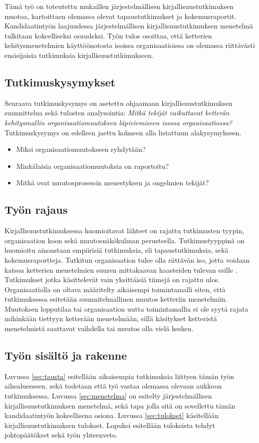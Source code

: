 Tämä työ on toteutettu mukaillen järjestelmällisen kirjallisuustutkimuksen
muotoa, kartoittaen olemassa olevat tapaustutkimukset ja kokemusraportit.
Kandidaatintyön laajuudessa järjestelmällisen kirjallisuustutkimuksen menetelmä
tulkitaan kokeelliseksi osuudeksi. Työn tulos osoittaa, että ketterien
kehitysmenetelmien käyttöönotosta isoissa organisaatioissa on olemassa
riittävästi ensisijaisia tutkimuksia kirjallisuustutkimukseen.

\subsection{Tutkimuskysymykset}
Seuraava tutkimuskysymys on asetettu ohjaamaan kirjallisuustutkimuksen
suunnittelua sekä tulosten analysointia:
\textit{Mitkä tekijät vaikuttavat ketterän kehitysmallin organisaatiomuutoksen
läpiviemiseen isossa organisaatiossa?} Tutkimuskysymys on edelleen jaettu
kolmeen alla listattuun alakysymykseen.

\begin{itemize}
\item Miksi organisaatiomuutokseen ryhdytään?
\item Minkälaisia organisaatiomuutoksia on raportoitu?
\item Mitkä ovat muutosprosessin menestyksen ja ongelmien tekijät?
\end{itemize}

\subsection{Työn rajaus}
Kirjallisuustutkimuksessa huomioitavat lähteet on rajattu tutkimusten tyypin,
organisaation koon sekä muutosnäkökulman perusteella. Tutkimustyyppinä on
huomioitu ainoastaan empiirisiä tutkimuksia, eli tapaustutkimuksia, sekä
kokemusraportteja. Tutkitun organisaation tulee olla riittävän iso, jotta
voidaan katsoa ketterien menetelmien suuren mittakaavan haasteiden tulevan
esille . Tutkimukset jotka käsittelevät vain yksittäisiä
tiimejä on rajattu ulos. Organisaatiolla on oltava määritelty aikaisempi
toimintamalli siten, että tutkimuksessa esitetään suunnitelmallinen muutos
ketteriin menetelmiin. Muutoksen lopputilaa tai organisaation uutta
toimintamallia ei ole syytä rajata mihinkään tiettyyn ketterään menetelmään,
sillä käsitykset ketteristä menetelmistä saattavat vaihdella tai muutos olla
vielä kesken.

\subsection{Työn sisältö ja rakenne}
Luvussa \ref{sec:tausta} esitellään aikaisempia tutkimuksia liittyen tämän työn
aihealueeseen, sekä todetaan että työ vastaa olemassa olevaan aukkoon
tutkimuksessa. Luvussa \ref{sec:menetelma} on esitelty järjestelmällisen
kirjallisuustutkimuksen menetelmä, sekä tapa jolla sitä on sovellettu tämän
kandidaatintyön kokeellisena osiona. Luvussa \ref{sec:tulokset} käsitellään
kirjallisuustutkimuksen tulokset. Lopuksi esitellään tuloksista tehdyt
johtopäätökset sekä työn yhteenveto.


